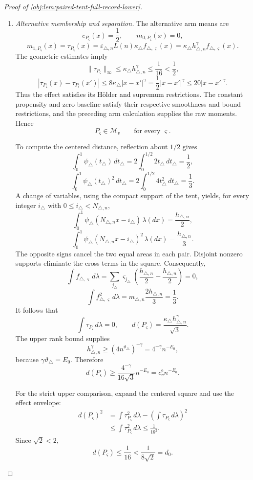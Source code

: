 \begin{proof}[Proof of \cref{obj:lem:paired-tent-full-record-lower}]
\begin{enumerate}
\item \emph{Alternative membership and separation.}
The alternative arm means are
\[
e_{P_\varsigma}(x)=\frac12,
\qquad
m_{0,P_\varsigma}(x)=0,
\]
\[
m_{1,P_\varsigma}(x)=\tau_{P_\varsigma}(x)
=
\varepsilon_{\triangle,n}L(n)\kappa_\triangle
f_{\triangle,\varsigma}(x)
=
\kappa_\triangle h_{\triangle,n}^{\gamma}
f_{\triangle,\varsigma}(x).
\]
The geometric estimates imply
\[
\|\tau_{P_\varsigma}\|_\infty
\le\kappa_\triangle h_{\triangle,n}^{\gamma}
\le\frac1{16}<\frac12,
\]
\[
|\tau_{P_\varsigma}(x)-\tau_{P_\varsigma}(x')|
\le8\kappa_\triangle|x-x'|^\gamma
=\frac12|x-x'|^\gamma
\le20|x-x'|^\gamma.
\]
Thus the effect satisfies its Hölder and supremum restrictions. The constant
propensity and zero baseline satisfy their respective smoothness and bound
restrictions, and the preceding arm calculation supplies the raw moments.
Hence
\[
P_\varsigma\in\mathcal M_v
\qquad\text{for every }\varsigma.
\]

To compute the centered distance, reflection about \(1/2\) gives
\[
\int_0^1\psi_\triangle(t_\triangle)\,dt_\triangle
=
2\int_0^{1/2}2t_\triangle\,dt_\triangle=\frac12,
\]
\[
\int_0^1\psi_\triangle(t_\triangle)^2\,dt_\triangle
=
2\int_0^{1/2}4t_\triangle^2\,dt_\triangle=\frac13.
\]
A change of variables, using the compact support of the tent, yields, for
every integer \(i_\triangle\) with \(0\le i_\triangle<N_{\triangle,n}\),
\[
\int_0^1
\psi_\triangle(N_{\triangle,n}x-i_\triangle)\,\lambda(dx)
=\frac{h_{\triangle,n}}2,
\]
\[
\int_0^1
\psi_\triangle(N_{\triangle,n}x-i_\triangle)^2\,\lambda(dx)
=\frac{h_{\triangle,n}}3.
\]
The opposite signs cancel the two equal areas in each pair. Disjoint nonzero
supports eliminate the cross terms in the square. Consequently,
\[
\int f_{\triangle,\varsigma}\,d\lambda
=
\sum_{j_\triangle}\varsigma_{j_\triangle}
\left(\frac{h_{\triangle,n}}2-\frac{h_{\triangle,n}}2\right)=0,
\]
\[
\int f_{\triangle,\varsigma}^2\,d\lambda
=
m_{\triangle,n}\frac{2h_{\triangle,n}}3=\frac13.
\]
It follows that
\[
\int\tau_{P_\varsigma}\,d\lambda=0,
\qquad
d(P_\varsigma)
=\frac{\kappa_\triangle h_{\triangle,n}^{\gamma}}{\sqrt3}.
\]
The upper rank bound supplies
\[
h_{\triangle,n}^{\gamma}
\ge(4n^{\vartheta_\triangle})^{-\gamma}
=4^{-\gamma}n^{-E_0},
\]
because \(\gamma\vartheta_\triangle=E_0\). Therefore
\[
d(P_\varsigma)\ge
\frac{4^{-\gamma}}{16\sqrt3}n^{-E_0}
=c_v^{\mathrm e}n^{-E_0}.
\]

For the strict upper comparison, expand the centered square and use the
effect envelope:
\[
\begin{aligned}
d(P_\varsigma)^2
&=
\int\tau_{P_\varsigma}^2\,d\lambda
-\left(\int\tau_{P_\varsigma}\,d\lambda\right)^2\\
&\le\int\tau_{P_\varsigma}^2\,d\lambda
\le\frac1{16^2}.
\end{aligned}
\]
Since \(\sqrt2<2\),
\[
d(P_\varsigma)\le\frac1{16}
<\frac1{8\sqrt2}=d_0.
\]


\end{enumerate}
\end{proof}
